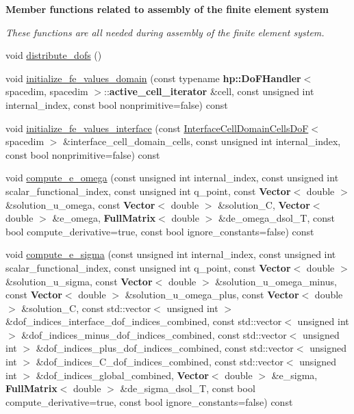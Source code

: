 \begin{Indent}{\bf Member functions related to assembly of the finite element system}\par
{\em These functions are all needed during assembly of the finite element system. }\begin{DoxyCompactItemize}
\item 
void \hyperlink{class_assembly_helper_a953859cc4cd745a1b51fdec5418be682}{distribute\+\_\+dofs} ()
\item 
void \hyperlink{class_assembly_helper_ab4c51b059d53f0086ebce3b60d4d2400}{initialize\+\_\+fe\+\_\+values\+\_\+domain} (const typename {\bf hp\+::\+Do\+F\+Handler}$<$ spacedim, spacedim $>$\+::{\bf active\+\_\+cell\+\_\+iterator} \&cell, const unsigned int internal\+\_\+index, const bool nonprimitive=false) const 
\item 
void \hyperlink{class_assembly_helper_a07b7b359ed67e0f949aa8817853ad0c2}{initialize\+\_\+fe\+\_\+values\+\_\+interface} (const \hyperlink{class_interface_cell_domain_cells_do_f}{Interface\+Cell\+Domain\+Cells\+DoF}$<$ spacedim $>$ \&interface\+\_\+cell\+\_\+domain\+\_\+cells, const unsigned int internal\+\_\+index, const bool nonprimitive=false) const 
\item 
void \hyperlink{class_assembly_helper_a78e22b83e1effe9b40d26ed150bebc7f}{compute\+\_\+e\+\_\+omega} (const unsigned int internal\+\_\+index, const unsigned int scalar\+\_\+functional\+\_\+index, const unsigned int q\+\_\+point, const {\bf Vector}$<$ double $>$ \&solution\+\_\+u\+\_\+omega, const {\bf Vector}$<$ double $>$ \&solution\+\_\+C, {\bf Vector}$<$ double $>$ \&e\+\_\+omega, {\bf Full\+Matrix}$<$ double $>$ \&de\+\_\+omega\+\_\+dsol\+\_\+T, const bool compute\+\_\+derivative=true, const bool ignore\+\_\+constants=false) const 
\item 
void \hyperlink{class_assembly_helper_a17cff5d9e32bd2ceac43d9218edd0b9b}{compute\+\_\+e\+\_\+sigma} (const unsigned int internal\+\_\+index, const unsigned int scalar\+\_\+functional\+\_\+index, const unsigned int q\+\_\+point, const {\bf Vector}$<$ double $>$ \&solution\+\_\+u\+\_\+sigma, const {\bf Vector}$<$ double $>$ \&solution\+\_\+u\+\_\+omega\+\_\+minus, const {\bf Vector}$<$ double $>$ \&solution\+\_\+u\+\_\+omega\+\_\+plus, const {\bf Vector}$<$ double $>$ \&solution\+\_\+C, const std\+::vector$<$ unsigned int $>$ \&dof\+\_\+indices\+\_\+interface\+\_\+dof\+\_\+indices\+\_\+combined, const std\+::vector$<$ unsigned int $>$ \&dof\+\_\+indices\+\_\+minus\+\_\+dof\+\_\+indices\+\_\+combined, const std\+::vector$<$ unsigned int $>$ \&dof\+\_\+indices\+\_\+plus\+\_\+dof\+\_\+indices\+\_\+combined, const std\+::vector$<$ unsigned int $>$ \&dof\+\_\+indices\+\_\+\+C\+\_\+dof\+\_\+indices\+\_\+combined, const std\+::vector$<$ unsigned int $>$ \&dof\+\_\+indices\+\_\+global\+\_\+combined, {\bf Vector}$<$ double $>$ \&e\+\_\+sigma, {\bf Full\+Matrix}$<$ double $>$ \&de\+\_\+sigma\+\_\+dsol\+\_\+T, const bool compute\+\_\+derivative=true, const bool ignore\+\_\+constants=false) const 

\end{DoxyCompactItemize}
\end{Indent}
